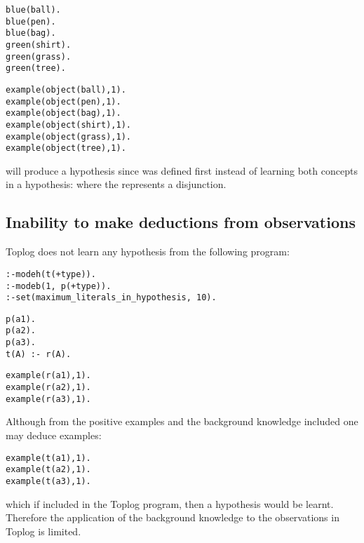 \begin{minipage}[t]{.35\textwidth}
\begin{lstlisting}
blue(ball).
blue(pen).
blue(bag).
green(shirt).
green(grass).
green(tree).\end{lstlisting}
\end{minipage}
\begin{minipage}[t]{.20\textwidth}
\begin{lstlisting}
example(object(ball),1).
example(object(pen),1).
example(object(bag),1).
example(object(shirt),1).
example(object(grass),1).
example(object(tree),1).
\end{lstlisting}
\end{minipage}

will produce a hypothesis  since 
 was defined first instead of learning both
concepts in a hypothesis:
 where the \tc{;} represents a disjunction.

\subsection{Inability to make deductions from observations}
Toplog does not learn any hypothesis from the following program:

\begin{lstlisting}
:-modeh(t(+type)).
:-modeb(1, p(+type)).
:-set(maximum_literals_in_hypothesis, 10).
\end{lstlisting}
\begin{minipage}[t]{.40\textwidth}
\begin{lstlisting}
p(a1).
p(a2).
p(a3).
t(A) :- r(A).
\end{lstlisting}
\end{minipage}
\begin{minipage}[t]{.40\textwidth}
\begin{lstlisting}
example(r(a1),1).
example(r(a2),1).
example(r(a3),1).
\end{lstlisting}
\end{minipage}

Although from the positive examples and the background knowledge included one may deduce examples:
\begin{lstlisting}
example(t(a1),1).
example(t(a2),1).
example(t(a3),1).
\end{lstlisting}
which if included in the Toplog program, then a hypothesis
 would be learnt.
Therefore the application of the background knowledge to the observations in Toplog is limited.

